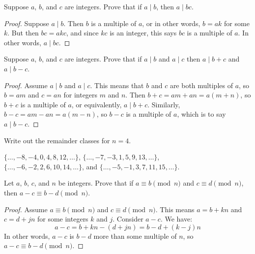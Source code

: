 
\begin{questions}
\question Suppose $a$, $b$, and $c$ are integers.  Prove that if $a \mid b$, then $a \mid bc$.

	\begin{answer}
		\begin{proof}
			Suppose $a \mid b$.  Then $b$ is a multiple of $a$, or in other words, $b = ak$ for some $k$.  But then $bc = akc$, and since $kc$ is an integer, this says $bc$ is a multiple of $a$.  In other words, $a \mid bc$.
		\end{proof}
	\end{answer}
	
	
	
	
	

\question Suppose $a$, $b$, and $c$ are integers.  Prove that if $a \mid b$ and $a \mid c$ then $a \mid b+c$ and $a \mid b-c$.

	\begin{answer}
		\begin{proof}
			Assume $a \mid b$ and $a \mid c$.  This means that $b$ and $c$ are both multiples of $a$, so $b = am$ and $c = an$ for integers $m$ and $n$.  Then $b+c = am+an = a(m+n)$, so $b+c$ is a multiple of $a$, or equivalently, $a \mid b+c$.  Similarly, $b-c = am-an = a(m-n)$, so $b-c$ is a multiple of $a$, which is to say $a \mid b-c$.
		\end{proof}
	\end{answer}
	






\question Write out the remainder classes for $n = 4$.

	\begin{answer}
		$\{\ldots, -8, -4, 0, 4, 8, 12, \ldots\}$, $\{\ldots, -7, -3, 1, 5, 9, 13, \ldots\}$,\\ $\{\ldots, -6, -2, 2, 6, 10, 14, \ldots\}$, and $\{\ldots, -5, -1, 3, 7, 11, 15, \ldots\}$.
	\end{answer}
	
	





\question Let $a$, $b$, $c$, and $n$ be integers.  Prove that if $a \equiv b \pmod{n}$ and $c \equiv d \pmod{n}$, then $a-c \equiv b-d \pmod{n}$.

	\begin{answer}
		\begin{proof}
			Assume $a \equiv b \pmod n$ and $c \equiv d \pmod n$.  This means $a = b + kn$ and $c = d + jn$ for some integers $k$ and $j$.  Consider $a-c$.  We have:
			\[a-c = b+kn - (d+jn) = b-d + (k-j)n\]
			In other words, $a-c$ is $b-d$ more than some multiple of $n$, so $a-c \equiv b-d \pmod n$.
		\end{proof}
	\end{answer}	
	






\end{questions}
